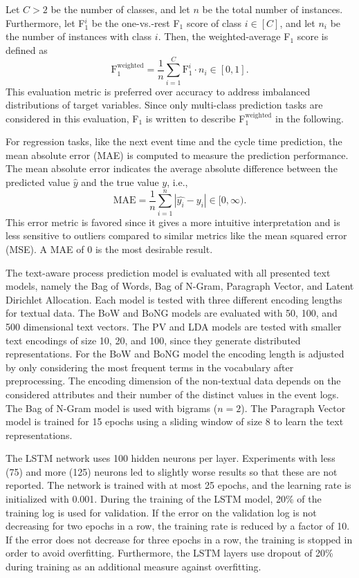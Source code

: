 Let $C>2$ be the number of classes, and let $n$ be the total number of instances.
Furthermore, let F$_1^i$ be the one-vs.-rest F$_1$ score of class $i \in [C]$, and let $n_i$ be the number of instances with class $i$.
Then, the weighted-average F$_1$ score is defined as
\begin{equation*}
	\textrm{F}_1^\mathrm{weighted} = \dfrac{1}{n} \sum_{i = 1}^{C} \mathrm{F}_1^i \cdot n_i \in [0,1].
\end{equation*}
This evaluation metric is preferred over accuracy to address imbalanced distributions of target variables.
Since only multi-class prediction tasks are considered in this evaluation, F$_1$ is written to describe F$_1^\mathrm{weighted}$ in the following.

For regression tasks, like the next event time and the cycle time prediction, the mean absolute error (MAE) is computed to measure the prediction performance. The mean absolute error indicates the average absolute difference between the predicted value $\hat{y}$ and the true value $y$, i.e.,
\begin{equation*}
	\textrm{MAE} = \dfrac{1}{n}\sum_{i=1}^{n}|\hat{y_i} - y_i| \in [0, \infty).
\end{equation*}
This error metric is favored since it gives a more intuitive interpretation and is less sensitive to outliers compared to similar metrics like the mean squared error (MSE).
A MAE of 0 is the most desirable result.

The text-aware process prediction model is evaluated with all presented text models, namely the Bag of Words, Bag of N-Gram, Paragraph Vector, and Latent Dirichlet Allocation.
Each model is tested with three different encoding lengths for textual data.
The BoW and BoNG models are evaluated with 50, 100, and 500 dimensional text vectors.
The PV and LDA models are tested with smaller text encodings of size 10, 20, and 100, since they generate distributed representations.
For the BoW and BoNG model the encoding length is adjusted by only considering the most frequent terms in the vocabulary after preprocessing.
The encoding dimension of the non-textual data depends on the considered attributes and their number of the distinct values in the event logs.
The Bag of N-Gram model is used with bigrams ($n = 2$).
The Paragraph Vector model is trained for 15 epochs using a sliding window of size 8 to learn the text representations.

The LSTM network uses 100 hidden neurons per layer.
Experiments with less (75) and more (125) neurons led to slightly worse results so that these are not reported.
The network is trained with at most 25 epochs, and the learning rate is initialized with 0.001.
During the training of the LSTM model, 20\% of the training log is used for validation.
If the error on the validation log is not decreasing for two epochs in a row, the training rate is reduced by a factor of 10.
If the error does not decrease for three epochs in a row, the training is stopped in order to avoid overfitting.
Furthermore, the LSTM layers use dropout of 20\% during training as an additional measure against overfitting.


